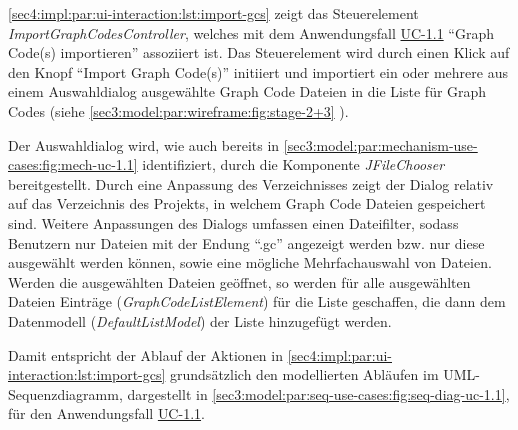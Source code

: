\cref{sec4:impl:par:ui-interaction:lst:import-gcs} zeigt das Steuerelement \textit{ImportGraphCodesController}, welches mit dem Anwendungsfall \hyperref[sec3:model:uc-1.1]{UC-1.1} \enquote{Graph Code(s) importieren} assoziiert ist.
Das Steuerelement wird durch einen Klick auf den Knopf \enquote{Import Graph Code(s)} initiiert und importiert ein oder mehrere aus einem Auswahldialog ausgewählte Graph Code Dateien in die Liste für Graph Codes (siehe \cref{sec3:model:par:wireframe:fig:stage-2+3} ).



Der Auswahldialog wird, wie auch bereits in \cref{sec3:model:par:mechanism-use-cases:fig:mech-uc-1.1} identifiziert, durch die Komponente \textit{JFileChooser} bereitgestellt.
Durch eine Anpassung des Verzeichnisses zeigt der Dialog relativ auf das Verzeichnis des Projekts, in welchem Graph Code Dateien gespeichert sind.
Weitere Anpassungen des Dialogs umfassen einen Dateifilter, sodass Benutzern nur Dateien mit der Endung \enquote{.gc} angezeigt werden bzw. nur diese ausgewählt werden können, sowie eine mögliche Mehrfachauswahl von Dateien.
Werden die ausgewählten Dateien geöffnet, so werden für alle ausgewählten Dateien Einträge (\textit{GraphCodeListElement}) für die Liste geschaffen, die dann dem Datenmodell (\textit{DefaultListModel}) der Liste hinzugefügt werden.

Damit entspricht der Ablauf der Aktionen in \cref{sec4:impl:par:ui-interaction:lst:import-gcs} grundsätzlich den modellierten Abläufen im UML-Sequenzdiagramm, dargestellt in \cref{sec3:model:par:seq-use-cases:fig:seq-diag-uc-1.1}, für den Anwendungsfall \hyperref[sec3:model:uc-1.1]{UC-1.1}.



